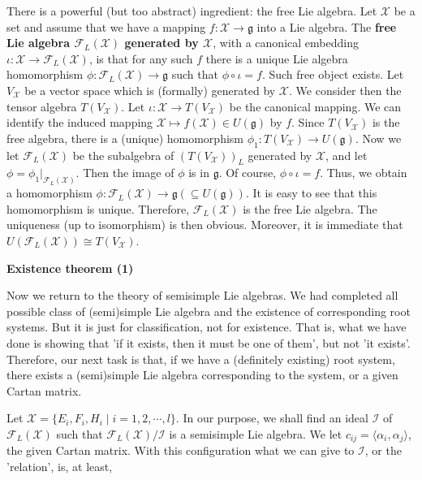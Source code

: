 \documentclass{article}
\newcommand{\SBar}{\;|\;}
\newcommand{\lie}[1]{\mathfrak{#1}}
\begin{document}
There is a powerful (but too abstract) ingredient: the free Lie algebra.
Let $\mathcal{X}$ be a set and assume that we have a mapping $f : \mathcal{X} \to \lie{g}$ into a Lie algebra.
The \textbf{free Lie algebra $\mathcal{F}_L(\mathcal{X})$ generated by $\mathcal{X}$}, with a canonical embedding $\iota : \mathcal{X} \to \mathcal{F}_L(\mathcal{X})$, is that for any such $f$ there is a unique Lie algebra homomorphism $\phi : \mathcal{F}_L(\mathcal{X}) \to \lie{g}$ such that $\phi \circ \iota = f$.
Such free object exists.
Let $V_\mathcal{X}$ be a vector space which is (formally) generated by $\mathcal{X}$.
We consider then the tensor algebra $T(V_\mathcal{X})$.
Let $\iota : \mathcal{X} \to T(V_\mathcal{X})$ be the canonical mapping.
We can identify the induced mapping $\mathcal{X} \mapsto f(\mathcal{X}) \in U(\lie{g})$ by $f$.
Since $T(V_\mathcal{X})$ is the free algebra, there is a (unique) homomorphism $\phi_1 : T(V_\mathcal{X}) \to U(\lie{g})$.
Now we let $\mathcal{F}_L(\mathcal{X})$ be the subalgebra of $(T(V_\mathcal{X}))_L$ generated by $\mathcal{X}$, and let $\phi = \phi_1|_{\mathcal{F}_L(\mathcal{X})}$.
Then the image of $\phi$ is in $\lie{g}$.
Of course, $\phi \circ \iota = f$.
Thus, we obtain a homomorphism $\phi : \mathcal{F}_L(\mathcal{X}) \to \lie{g} (\subseteq U(\lie{g}))$.
It is easy to see that this homomorphism is unique.
Therefore, $\mathcal{F}_L(\mathcal{X})$ is the free Lie algebra.
The uniqueness (up to isomorphism) is then obvious.
Moreover, it is immediate that $U(\mathcal{F}_L(\mathcal{X})) \cong T(V_\mathcal{X})$.

\newpage

\textbf{Existence theorem (1)}

Now we return to the theory of semisimple Lie algebras.
We had completed all possible class of (semi)simple Lie algebra and the existence of corresponding root systems.
But it is just for classification, not for existence.
That is, what we have done is showing that 'if it exists, then it must be one of them', but not 'it exists'.
Therefore, our next task is that, if we have a (definitely existing) root system, there exists a (semi)simple Lie algebra corresponding to the system, or a given Cartan matrix.

Let $\mathcal{X} = \{E_i, F_i, H_i \SBar i = 1, 2, \cdots, l\}$.
In our purpose, we shall find an ideal $\mathcal{I}$ of $\mathcal{F}_L(\mathcal{X})$ such that $\mathcal{F}_L(\mathcal{X})/\mathcal{I}$ is a semisimple Lie algebra.
We let $c_{ij} = \langle \alpha_i, \alpha_j \rangle$, the given Cartan matrix.
With this configuration what we can give to $\mathcal{I}$, or the 'relation', is, at least, 
\end{document}

